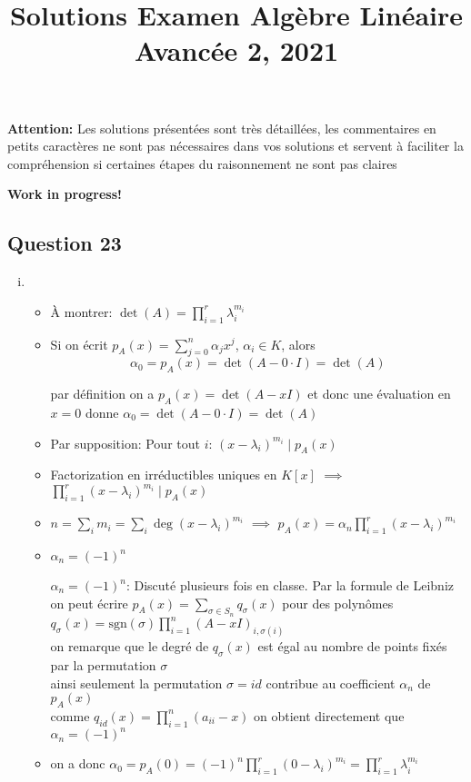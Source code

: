 \documentclass[11pt, a4paper, oneside]{article}
\newcommand{\indice}[1]{{\scriptsize \color{RubineRed} {#1}}}
\begin{document}
\title{Solutions Examen Algèbre Linéaire Avancée 2, 2021}
\maketitle

\noindent 
\textbf{Attention:} Les solutions présentées sont très détaillées, les commentaires en \indice{ petits caractères} ne sont pas  nécessaires dans vos solutions et servent à faciliter la compréhension si certaines étapes du raisonnement ne sont pas claires


\textbf{Work in progress!} 

\subsection*{Question 23}
\begin{enumerate}[i)] 
\item
  \begin{itemize}
  \item À montrer:  $\det(A) = \prod_{i=1}^r \lambda_i^{m_i}$
  \item   Si on écrit $p_A(x) = \sum_{j=0}^n \alpha_jx^j$, $α_i ∈K$, alors
    \begin{displaymath}
      \alpha_0 = p_A(x) = \det(A-0\cdot I) = \det(A)
    \end{displaymath}

    
\indice{par définition on a $p_A(x) = \det(A-xI)$ et donc une évaluation en $x=0$ donne $\alpha_0 = \det(A-0\cdot I) = \det(A)$}  
\item Par supposition: Pour tout $i$:  $(x- λ_i)^{m_i} \mid p_A(x)$ \\
\item Factorization en irréductibles uniques en $K[x]$ $⟹$   $ \prod_{i=1}^r (x-\lambda_i)^{m_i} \mid p_A(x) $  
\item $n = ∑_i m_i =  ∑_i \deg(x- λ_i)^{m_i} $  $⟹$ $p_A(x) = \alpha_n \prod_{i=1}^r (x-\lambda_i)^{m_i}$ 
\item $α_n = (-1)^n$
  
\indice{$α_n = (-1)^n$: Discuté plusieurs fois en classe. Par la formule de Leibniz on peut écrire $p_A(x) = \sum_{\sigma \in S_n} q_{\sigma}(x)$ pour des polynômes $q_{\sigma}(x) = \text{sgn}(\sigma)\prod_{i=1}^n(A-xI)_{i,\sigma(i)}$ \\
on remarque que le degré de $q_{\sigma}(x)$ est égal au nombre de points fixés par la permutation $\sigma$ \\
ainsi seulement la permutation $\sigma = id$ contribue au coefficient $\alpha_n$ de $p_A(x)$ \\
comme $q_{id}(x) = \prod_{i=1}^n(a_{ii}-x)$ on obtient directement que $\alpha_n = (-1)^n$ \\}
\item on a donc $α_0 = p_A(0) = (-1)^n \prod_{i=1}^r (0-\lambda_i)^{m_i} = \prod_{i=1}^r \lambda_i^{m_i}$   \\


\end{itemize}
\end{enumerate}
\end{document}
